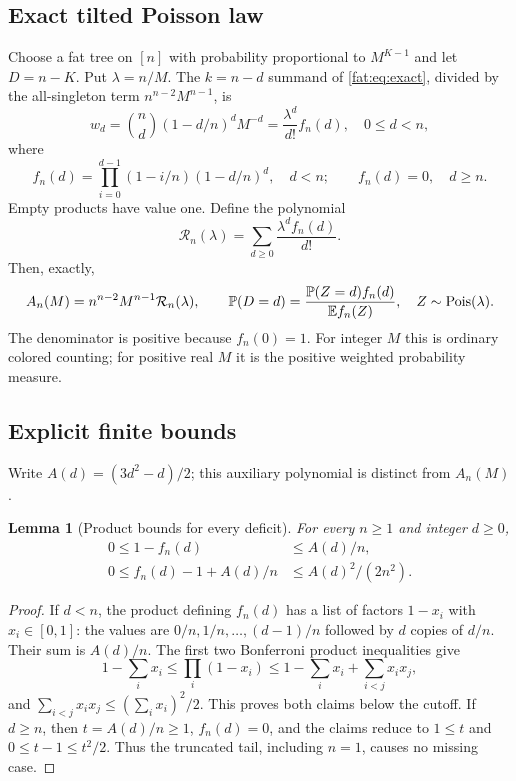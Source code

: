 \documentclass[11pt,letterpaper]{article}
\numberwithin{equation}{section}
\newtheorem{lemma}[theorem]{Lemma}
\theoremstyle{remark}\newtheorem{remark}[theorem]{Remark}
\newcommand{\E}{\mathbb E}\newcommand{\Prob}{\mathbb P}\newcommand{\ee}{\mathrm e}
\begin{document}
\subsection{Exact tilted Poisson law}
Choose a fat tree on $[n]$ with probability proportional to $M^{K-1}$ and let $D=n-K$. Put $\lambda=n/M$. The $k=n-d$ summand of \eqref{fat:eq:exact}, divided by the all-singleton term $n^{n-2}M^{n-1}$, is
\begin{equation}\label{fat:eq:weightdeficit}
 w_d=\binom nd(1-d/n)^dM^{-d}=\frac{\lambda^d}{d!}f_n(d),\quad 0\le d<n,
\end{equation}
where
\begin{equation}\label{fat:eq:fn}
 f_n(d)=\prod_{i=0}^{d-1}(1-i/n)(1-d/n)^d,\quad d<n;
 \qquad f_n(d)=0,\quad d\ge n.
\end{equation}
Empty products have value one. Define the polynomial
\[
 \mathcal R_n(\lambda)=\sum_{d\ge0}\frac{\lambda^d f_n(d)}{d!}.
\]
Then, exactly,
\begin{equation}\label{fat:eq:Rn}
 A_n(M)=n^{n-2}M^{n-1}\mathcal R_n(\lambda),\qquad
 \Prob(D=d)=\frac{\Prob(Z=d)f_n(d)}{\E f_n(Z)},\quad Z\sim\Pois(\lambda).
\end{equation}
The denominator is positive because $f_n(0)=1$. For integer $M$ this is ordinary colored counting; for positive real $M$ it is the positive weighted probability measure.

\subsection{Explicit finite bounds}
Write $A(d)=(3d^2-d)/2$; this auxiliary polynomial is distinct from $A_n(M)$.
\begin{lemma}[Product bounds for every deficit]\label{fat:lem:bonf}
For every $n\ge1$ and integer $d\ge0$,
\begin{align}
 0\le1-f_n(d)&\le A(d)/n,\label{fat:eq:bonf1}\\
 0\le f_n(d)-1+A(d)/n&\le A(d)^2/(2n^2).\label{fat:eq:bonf2}
\end{align}
\end{lemma}
\begin{proof}
If $d<n$, the product defining $f_n(d)$ has a list of factors $1-x_i$ with $x_i\in[0,1]$: the values are $0/n,1/n,\ldots,(d-1)/n$ followed by $d$ copies of $d/n$. Their sum is $A(d)/n$. The first two Bonferroni product inequalities give
\[
 1-\sum_i x_i\le\prod_i(1-x_i)
 \le1-\sum_i x_i+\sum_{i<j}x_ix_j,
\]
and $\sum_{i<j}x_ix_j\le(\sum_i x_i)^2/2$. This proves both claims below the cutoff. If $d\ge n$, then $t=A(d)/n\ge1$, $f_n(d)=0$, and the claims reduce to $1\le t$ and $0\le t-1\le t^2/2$. Thus the truncated tail, including $n=1$, causes no missing case.
\end{proof}
\end{document}
